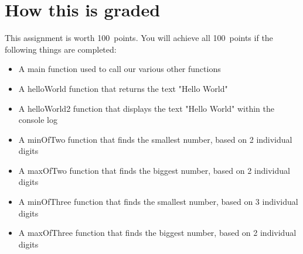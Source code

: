 \documentclass{article}
\newcommand{\AValue}{100}
\begin{document}
\section*{How this is graded}
This assignment is worth \AValue \ points. You will achieve all \AValue \   points if the following things are completed:
\begin{itemize}
    \item A main function used to call our various other functions
    \item A helloWorld function that returns the text "Hello World"
    \item A helloWorld2 function that displays the text "Hello World" within the console log
    \item A minOfTwo function that finds the smallest number, based on 2 individual digits
    \item A maxOfTwo function that finds the biggest number, based on 2 individual digits
    \item A minOfThree function that finds the smallest number, based on 3 individual digits
    \item A maxOfThree function that finds the biggest number, based on 2 individual digits
\end{itemize}
\end{document}

